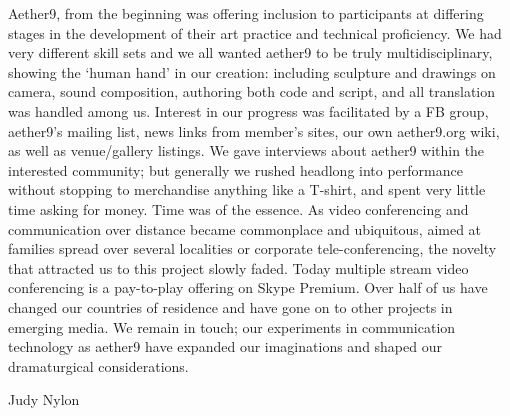 Aether9, from the beginning was offering inclusion to participants at differing stages in the development of their art practice and technical proficiency. We had very different skill sets and we all wanted aether9 to be truly multidisciplinary, showing the ‘human hand’ in our creation: including sculpture and drawings on camera, sound composition, authoring both code and script, and all translation was handled among us. Interest in our progress was facilitated by a FB group, aether9's mailing list, news links from member's sites, our own aether9.org wiki, as well as venue/gallery listings. We gave interviews about aether9 within the interested community; but generally we rushed headlong into performance without stopping to merchandise anything like a T-shirt, and spent very little time asking for money. Time was of the essence. As video conferencing and communication over distance became commonplace and ubiquitous, aimed at families spread over several localities or corporate tele-conferencing, the novelty that attracted us to this project slowly faded. Today multiple stream video conferencing is a pay-to-play offering on Skype Premium. Over half of us have changed our countries of residence and have gone on to other projects in emerging media. We remain in touch; our experiments in communication technology as aether9 have expanded our imaginations and shaped our dramaturgical considerations.
 
\setupindenting[no]
\styleinfos
Judy Nylon
